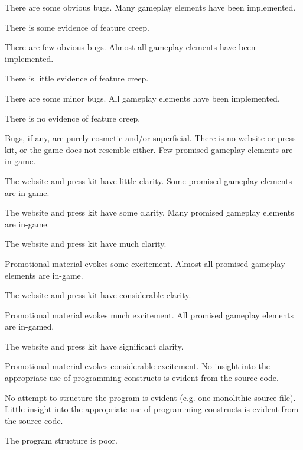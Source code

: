 \documentclass{../../fal_assignment}
\begin{document}
\begin{markingrubric}
            \par There are some obvious bugs.
        \grade Many gameplay elements have been implemented.
            \par There is some evidence of feature creep.
            \par There are few obvious bugs.
        \grade Almost all gameplay elements have been implemented.
            \par There is little evidence of feature creep.
            \par There are some minor bugs.
        \grade All gameplay elements have been implemented.
            \par There is no evidence of feature creep.
            \par Bugs, if any, are purely cosmetic and/or superficial.
%            
        \grade\fail There is no website or press kit, or the game does not resemble either.
        \grade Few promised gameplay elements are in-game.
            \par The website and press kit have little clarity.
        \grade Some promised gameplay elements are in-game.
            \par The website and press kit have some clarity.
        \grade Many promised gameplay elements are in-game.
            \par The website and press kit have much clarity.
            \par Promotional material evokes some excitement.
        \grade Almost all promised gameplay elements are in-game.
            \par The website and press kit have considerable clarity.
            \par Promotional material evokes much excitement.
        \grade All promised gameplay elements are in-gamed.
            \par The website and press kit have significant clarity.
            \par Promotional material evokes considerable excitement.
%
        \grade\fail No insight into the appropriate use of programming constructs is evident from the source code.
            \par No attempt to structure the program is evident (e.g. one monolithic source file).
        \grade Little insight into the appropriate use of programming constructs is evident from the source code.
            \par The program structure is poor.

\end{markingrubric}
\end{document}
